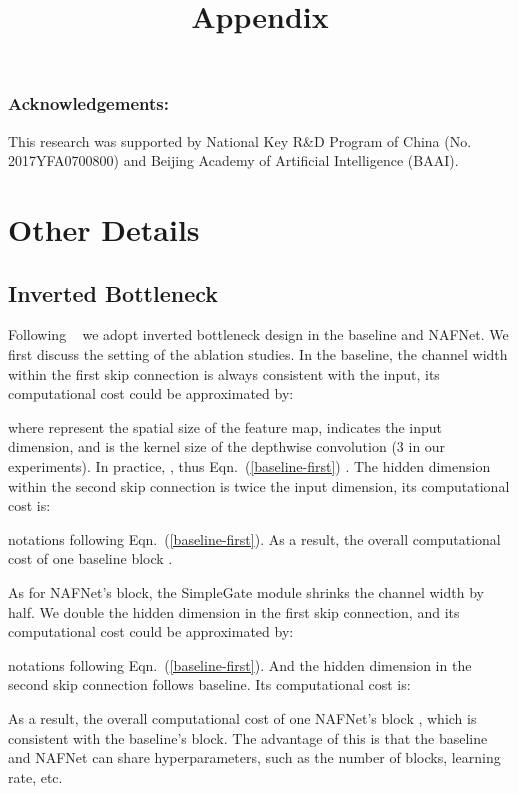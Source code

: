 \documentclass[runningheads]{llncs}
\begin{document}
\subsubsection{Acknowledgements:} This research was supported by National Key R\&D Program of China (No. 2017YFA0700800) and Beijing Academy of Artificial Intelligence (BAAI). 

\appendix
\title{Appendix}
\author{}
\institute{}
\maketitle


\section{Other Details}

\subsection{Inverted Bottleneck}
Following ~\cite{liu2022convnet} we adopt inverted bottleneck design in the baseline and NAFNet. We first discuss the setting of the ablation studies.
In the baseline, 
the channel width within the first skip connection is always consistent with the input, its computational cost could be approximated by:

where  represent the spatial size of the feature map,  indicates the input dimension, and  is the kernel size of the depthwise convolution (3 in our experiments). In practice, , thus Eqn.~(\ref{baseline-first}) .
The hidden dimension within the second skip connection is twice the input dimension, its computational cost is:

notations following Eqn.~(\ref{baseline-first}). As a result, the overall computational cost of one baseline block . 

As for NAFNet's block, the SimpleGate module shrinks the channel width by half. We double the hidden dimension in the first skip connection, and its computational cost could be approximated by:

notations following Eqn.~(\ref{baseline-first}). And the hidden dimension in the second skip connection follows baseline. Its computational cost is:

As a result, the overall computational cost of one NAFNet's block , which is consistent with the baseline's block. The advantage of this is that the baseline and NAFNet can share hyperparameters, such as the number of blocks, learning rate, etc. 
\end{document}
